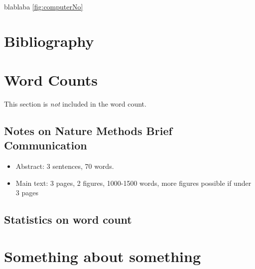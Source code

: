 \documentclass[times, twoside, watermark]{zHenriquesLab-StyleBioRxiv}
\begin{document}
blablaba \ref{fig:computerNo}
\blindtext

\begin{acknowledgements}
\blindtext
\end{acknowledgements}

\section*{Bibliography}


\onecolumn
\newpage

\section*{Word Counts}
This section is \textit{not} included in the word count. 
\subsection*{Notes on Nature Methods Brief Communication}
\begin{itemize}
\item Abstract: 3 sentences, 70 words.
\item Main text: 3 pages, 2 figures, 1000-1500 words, more figures possible if under 3 pages
\end{itemize}

\subsection*{Statistics on word count}
\detailtexcount
\newpage

\captionsetup*{format=largeformat}
\section{Something about something} \label{note:Note1} 
\Blindtext

\end{document}
